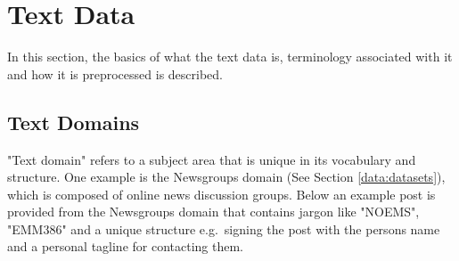 















\section{Text Data}\label{textdatach2}

 In this section, the basics of what the text data is, terminology associated with it and how it is preprocessed is described.

\subsection{Text Domains}\label{ch2textdomains}

"Text domain" refers to a subject area that is unique in its vocabulary and structure. One example is the Newsgroups domain (See Section \ref{data:datasets}), which is composed of online news discussion groups.  Below an example post is provided from the Newsgroups domain that contains  jargon like "NOEMS", "EMM386" and a unique structure e.g.\ signing the post with the persons name and a personal tagline for contacting them. %




